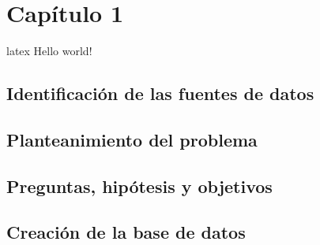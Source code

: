 \newpage

\begin{center}
\vspace*{15em}
{\huge\bfseries\color{blue}{Capítulo 1}\par}
{\huge\bfseries\color{blue}{Primer Capítulo}\par}
\end{center}
\chapter{Capítulo 1}
\gls{latex}
Hello world!~\cite{Carpizo1998,Kelsen1969,Castro1998}
\section{Identificación de las fuentes de datos}
\section{Planteanimiento del problema}
\section{Preguntas, hipótesis y objetivos}
\section{Creación de la base de datos}
